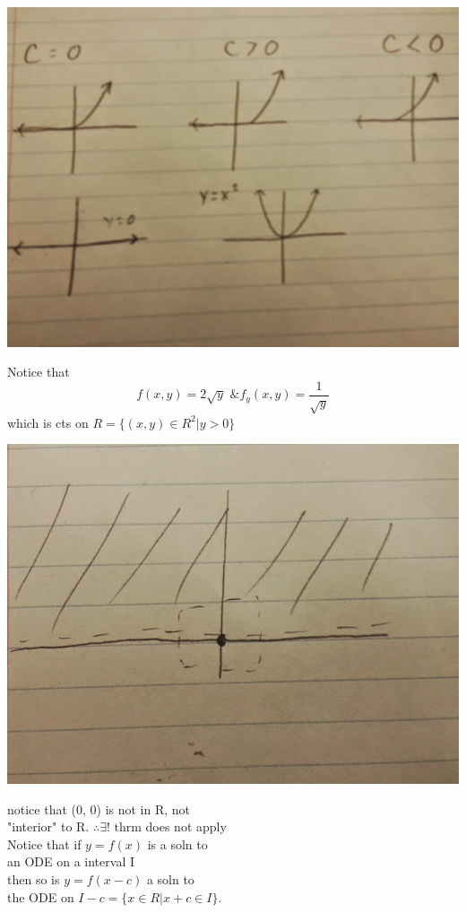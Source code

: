 \documentclass[10pt,a4paper]{article}
\begin{document}
  \includegraphics[scale=.45]{pic2}

  Notice that
  \[ f(x, y) = 2\sqrt{y} \text{ \& } f_y(x, y) = \frac{1}{ \sqrt{y}}\]
  which is cts on \( R = \{ (x, y) \in R^2 |  y > 0\}\)

  \includegraphics[scale=.45]{pic3}

  notice that (0, 0) is not in R, not \\
  "interior" to R. \( \therefore \exists \text{! thrm}\) does not apply
  \\
  Notice that if \( y = f(x) \) is a soln to \\
  an ODE on a interval I  \\
  then so is \( y = f(x-c)\) a soln to  \\
  the ODE on \( I - c =\{ x \in R | x + c \in I\}\).  \\
\end{document}
